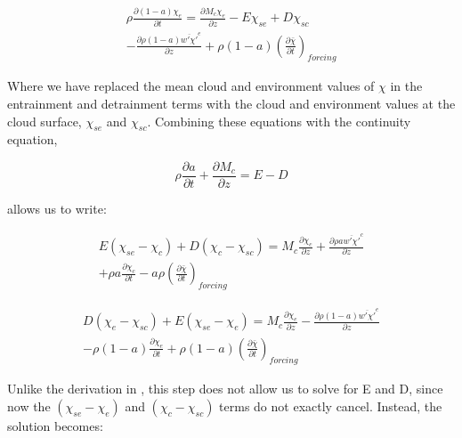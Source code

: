 \documentclass[12pt]{article}
\begin{document}
\begin{equation}
  \label{eq:derivation_detrainment}
  \begin{split}
    \rho \frac{\partial (1 - a) \chi_e}{\partial t}
    = \frac{\partial M_c \chi_e}{\partial z} 
    - E \chi_{se} + D \chi_{sc} \\
    - \frac{\partial \rho (1 - a) \overline{w' \chi'}^e}{\partial z} 
    + \rho (1 - a) \left(\frac{\partial \bar{\chi}}{\partial t}\right)_{forcing}
  \end{split}
\end{equation}

Where we have replaced the mean cloud and environment values of $\chi$ in the 
entrainment and detrainment terms with the cloud and environment 
values at the cloud surface, $\chi_{se}$ and $\chi_{sc}$.  Combining these 
equations with the continuity equation, 

\begin{equation}
    \label{eq:continuity}
    \rho \frac{\partial a}{\partial t} 
    + \frac{\partial M_c}{\partial z}
    = E - D
\end{equation}

allows us to write:

\begin{equation}
  \label{eq:entrainment_2}
  \begin{split}
    E (\chi_{se} - \chi_c) + D (\chi_c - \chi_{sc}) 
    = M_c \frac{\partial \chi_c}{\partial z}
    + \frac{\partial \rho a \overline{w' \chi'}^c}{\partial z} \\
    + \rho a \frac{\partial \chi_c}{\partial t}
    - a \rho \left(\frac{\partial \bar{\chi}}{\partial t}\right)_{forcing}
  \end{split}
\end{equation}

\begin{equation}
  \label{eq:detrainment_2}
  \begin{split}
    D (\chi_e - \chi_{sc}) + E (\chi_{se} - \chi_e)
    = M_c \frac{\partial \chi_e}{\partial z}
    - \frac{\partial \rho (1 - a) \overline{w' \chi'}^e}{\partial z} \\
    - \rho (1 - a) \frac{\partial \chi_e}{\partial t}
    + \rho (1 - a) \left(\frac{\partial \bar{\chi}}{\partial t}\right)_{forcing}
  \end{split}
\end{equation}

Unlike the derivation in \cite{Siebesma1995}, this step does not allow us to 
solve for E and D, since now the $(\chi_{se} - \chi_e)$ and 
$(\chi_c - \chi_{sc})$ terms do not exactly cancel.  Instead, the solution 
becomes:
\end{document}
